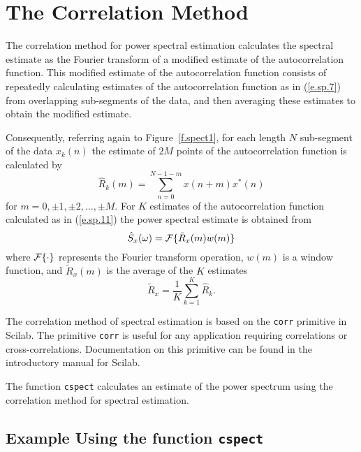 \section{The Correlation Method}

	The correlation method for power spectral estimation
calculates the spectral estimate as the Fourier transform
of a modified estimate of the autocorrelation function.
This modified estimate of the autocorrelation function
consists of repeatedly calculating estimates of the 
autocorrelation function as in (\ref{e.sp.7}) from
overlapping sub-segments of the data, and then averaging
these estimates to obtain the modified estimate.

	Consequently, referring again to Figure~\ref{f.spect1},
for each length $N$ sub-segment of the data $x_k(n)$ the estimate
of $2M$ points of the autocorrelation function is calculated by
%
\begin{equation}
\hat{R}_k(m)=\sum_{n=0}^{N-1-m}x(n+m)x^*(n)
\label{e.sp.11}
\end{equation}
%
for $m=0,\pm1,\pm2,\ldots,\pm M$.  For $K$ estimates of the autocorrelation 
function calculated as in (\ref{e.sp.11}) the power spectral estimate is
obtained from
%
\begin{equation}
\hat{S}_x(\omega)={\cal F}\{\tilde{R}_x(m)w(m)\}
\label{e.sp.12}
\end{equation}
%
where ${\cal F}\{\cdot\}$ represents the Fourier transform operation,
$w(m)$ is a window function, and $\tilde{R}_x(m)$ is the
average of the $K$ estimates
%
\begin{equation}
\tilde{R}_x=\frac{1}{K}\sum_{k=1}^{K}\hat{R}_k.
\label{e.sp.13}
\end{equation}
%

	The correlation method of spectral estimation is based
on the {\tt corr} primitive in Scilab.  The primitive {\tt corr}
is useful for any application requiring correlations or cross-correlations.
Documentation on this primitive can be found in the introductory
manual for Scilab.

The function {\tt cspect} calculates an estimate of
the power spectrum using the correlation method for spectral estimation.

\subsection{Example Using the function {\tt cspect}}

